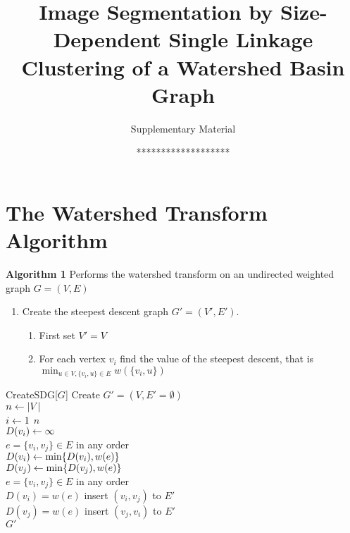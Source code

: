 \documentclass{llncs}
\begin{document}
\title{Image Segmentation by Size-Dependent Single Linkage
  Clustering of a Watershed Basin Graph}

\subtitle{Supplementary Material}

\author{{*}{*}{*}{*}{*}{*}{*}{*}{*}{*}{*}{*}{*}{*}{*}{*}{*}{*}{*}}


\institute{{*}{*}{*}{*}{*}{*}{*}{*}{*}{*}{*}\\
\texttt{{*}{*}{*}{*}{*}{*}{*}{*}{*}}\\
{*}{*}{*}{*}{*}{*}{*}{*}{*}{*}{*}\\
\texttt{{*}{*}{*}{*}{*}{*}{*}{*}{*}}}

\maketitle

\section{The Watershed Transform Algorithm}\label{sec:Introduction}



\textbf{Algorithm 1 } Performs the watershed transform on an undirected weighted graph
$G=(V,E)$

\begin{enumerate}
\item Create the steepest descent graph $G'=(V',E')$.
  \begin{enumerate}
  \item First set $V'=V$
  \item For each vertex $v_i$ find the value of the steepest descent, that is
    $\min_{u \in V, \{v_i,u\} \in E}w(\{v_i,u\})$
  \end{enumerate}
\end{enumerate}

\begin{algorithm}{CreateSDG}[$G$]{
    \label{algo:createsdg}
  }
  Create $G'=(V,E'=\emptyset)$ \\
  $n \mathrel{\leftarrow} |V|$ \\
  \qfor $i \mathrel{\leftarrow} 1$ \qto $n$ \\
  \qdo $D(v_i) \mathrel{\leftarrow} \infty$ \qrof \\
  \qfor $e = \{v_i,v_j\} \in E$ in any order\\
  \qdo $D(v_i) \mathrel{\leftarrow} \min\{D(v_i),w(e)\}$ \\
  $D(v_j) \mathrel{\leftarrow} \min\{D(v_j),w(e)\}$ \qrof \\
  \qfor $e = \{v_i,v_j\} \in E$ in any order \\
  \qdo \qqif $D(v_i) = w(e)$ \qqthen insert $(v_i,v_j)$ to $E'$ \\
  \qqif $D(v_j) = w(e)$ \qqthen insert $(v_j,v_i)$ to $E'$ \qrof \\
  \qreturn $G'$
\end{algorithm}
\end{document}
